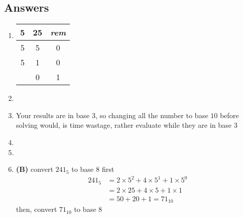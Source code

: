 \subsection{Answers}
\begin{multicols}{2}
\begin{enumerate}[label={\arabic*.}]
    \item \begin{tabular}{c|cc}
        5 & 25 & \textit{rem} \\ \hline
        5 & 5 & 0 \\ \hline
        5 & 1 & 0 \\ \hline
         & 0 & 1
    \end{tabular}
    \item 
    \item Your results are in base $3$, so changing all the number to base $10$ before solving would, is time wastage, 
    rather evaluate while they are in base $3$
    \item
    \item
    \item \textbf{(B)} convert $241_5$ to base $8$ first
    \begin{align*}
    241_5 & = 2 \times 5^2 + 4 \times 5^1 + 1 \times 5^0 \\
        & = 2 \times 25 + 4 \times 5 + 1 \times 1 \\
        & = 50 + 20 + 1 = 71_{10}
    \end{align*}
    then, convert $71_{10}$ to base  $8$ \\


\end{enumerate}
\end{multicols}
